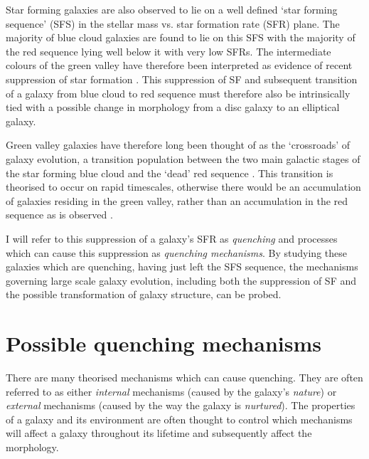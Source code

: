 Star forming galaxies are also observed to lie on a well defined `star forming sequence' (SFS) in the stellar mass vs. star formation rate (SFR) plane. The majority of blue cloud galaxies are found to lie on this SFS with the majority of the red sequence lying well below it with very low SFRs. The intermediate colours of the green valley have therefore been interpreted as evidence of recent suppression of star formation \citep[SF;][]{Salim07}. This suppression of SF and subsequent transition of a galaxy from blue cloud to red sequence must therefore also be intrinsically tied with a possible change in morphology from a disc galaxy to an elliptical galaxy.

Green valley galaxies have therefore long been thought of as the `crossroads' of galaxy evolution, a transition population between the two main galactic stages of the star forming blue cloud and the `dead' red sequence \citep{Bell04, Wyder07, Schim07, Martin07, Faber07, Mendez11, Gonc12, schawinski14, Pan14}. This transition is theorised to occur on rapid timescales, otherwise there would be an accumulation of galaxies residing in the green valley, rather than an accumulation in the red sequence as is observed \citep{Arnouts07, Martin07}.

I will refer to this suppression of a galaxy's SFR as \emph{quenching} and processes which can cause this suppression as \emph{quenching mechanisms}. By studying these galaxies which are quenching, having just left the SFS sequence, the mechanisms governing large scale galaxy evolution, including both the suppression of SF and the possible transformation of galaxy structure, can be probed. 

\section{Possible quenching mechanisms}\label{sec:quenchmech}

There are many theorised mechanisms which can cause quenching. They are often referred to as either \emph{internal} mechanisms (caused by the galaxy's \emph{nature}) or \emph{external} mechanisms (caused by the way the galaxy is \emph{nurtured}). The properties of a galaxy and its environment are often thought to control which mechanisms will affect a galaxy throughout its lifetime and subsequently affect the morphology. 

